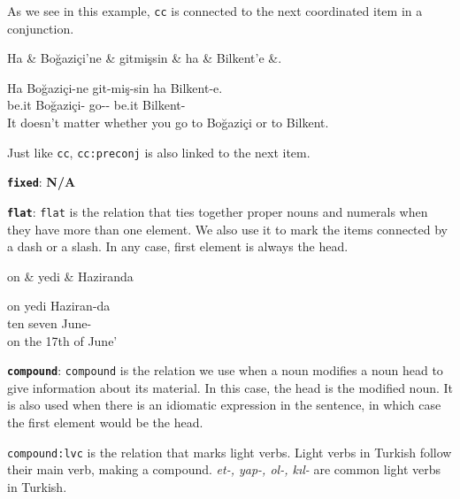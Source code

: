 \documentclass[11pt,a4paper]{article}
\begin{document}
As we see in this example, \texttt{cc} is connected to the next coordinated item in a conjunction.

\begin{exe}
\ex \label{cc:preconj}
\begin{dependency}
\begin{deptext}[column sep=0.24cm]
Ha \& Boğaziçi'ne \& gitmişsin \& ha \& Bilkent'e \&. \\
\end{deptext}
\end{dependency}
\gll Ha Boğaziçi-ne git-miş-sin ha Bilkent-e. \\
be.it Boğaziçi-\Loc{} go-\Pst{}-\Ssg{} be.it Bilkent-\Loc{}\\
\glt It doesn’t matter whether you go to Boğaziçi or to Bilkent.
\end{exe}

Just like \texttt{cc}, \texttt{cc:preconj} is also linked to the next item.

\textbf{\texttt{fixed}}:
\textbf{N/A}

\textbf{\texttt{flat}}:
\texttt{flat} is the relation that ties together proper nouns and numerals when they have more than one element. We also use it to mark the items connected by a dash or a slash. In any case, first element is always the head.

\begin{exe}
\ex \label{flat}
\begin{dependency}
\begin{deptext}
on \& yedi \& Haziranda \\
\end{deptext}
\end{dependency}
\gll on yedi Haziran-da \\
ten seven June-\Loc{} \\
\glt on the 17th of June’
\end{exe}

\textbf{\texttt{compound}}:
\texttt{compound} is the relation we use when a noun modifies a noun head to give information about its material. In this case, the head is the modified noun. It is also used when there is an idiomatic expression in the sentence, in which case the first element would be the head.

\texttt{compound:lvc} is the relation that marks light verbs. Light verbs in Turkish follow their main verb, making a compound. \textit{et-, yap-, ol-, kıl-} are common light verbs in Turkish.
\end{document}
